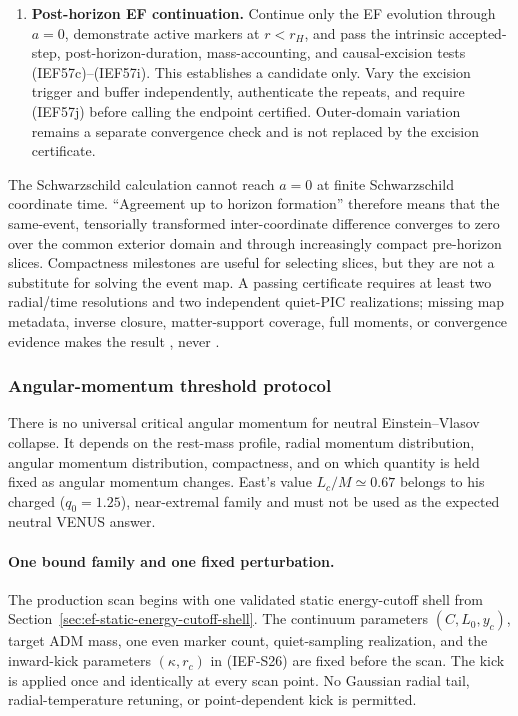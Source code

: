 \begin{enumerate}
      radial arrays are not a test of coordinate equivalence.
\item \textbf{Post-horizon EF continuation.}
      Continue only the EF evolution through \(a=0\), demonstrate active
      markers at \(r<r_H\), and pass the intrinsic accepted-step,
      post-horizon-duration, mass-accounting, and causal-excision tests
      (IEF57c)--(IEF57i).  This establishes a candidate only.  Vary the
      excision trigger and buffer independently, authenticate the repeats,
      and require (IEF57j) before calling the endpoint certified.  Outer-domain
      variation remains a separate convergence check and is not replaced by
      the excision certificate.
\end{enumerate}

The Schwarzschild calculation cannot reach \(a=0\) at finite Schwarzschild
coordinate time.  ``Agreement up to horizon formation'' therefore means that
the same-event, tensorially transformed inter-coordinate difference converges
to zero over the common exterior domain and through increasingly compact
pre-horizon slices.  Compactness milestones are useful for selecting slices,
but they are not a substitute for solving the event map.  A passing certificate
requires at least two radial/time resolutions and two independent quiet-PIC
realizations; missing map metadata, inverse closure, matter-support coverage,
full moments, or convergence evidence makes the result
, never .

\subsubsection{Angular-momentum threshold protocol}

There is no universal critical angular momentum for neutral
Einstein--Vlasov collapse.  It depends on the rest-mass profile, radial
momentum distribution, angular momentum distribution, compactness, and on
which quantity is held fixed as angular momentum changes.  East's value
\(L_c/M\simeq0.67\) belongs to his charged (\(q_0=1.25\)), near-extremal family and
must not be used as the expected neutral VENUS answer.

\paragraph{One bound family and one fixed perturbation.}
The production scan begins with one validated static energy-cutoff shell from
Section~\ref{sec:ef-static-energy-cutoff-shell}.  The continuum parameters
\((C,L_0,y_c)\), target ADM mass, one even marker count, quiet-sampling
realization, and the inward-kick parameters \((\kappa,r_c)\) in (IEF-S26) are
fixed before the scan.  The kick is applied once and identically at every
scan point.  No Gaussian radial tail, radial-temperature retuning, or
point-dependent kick is permitted.

